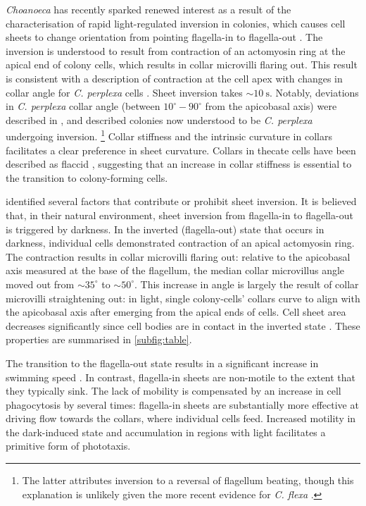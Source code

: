 \textit{Choanoeca} has recently sparked renewed interest as a result of the characterisation of rapid light-regulated inversion in colonies, which causes cell sheets to change orientation from pointing flagella-in to flagella-out \citep{brunet2019}.
The inversion is understood to result from contraction of an actomyosin ring at the apical end of colony cells, which results in collar microvilli flaring out. 
This result is consistent with a description of contraction at the cell apex with changes in collar angle for \textit{C. perplexa} cells \citep{leadbeater1977}.
Sheet inversion takes $\sim\SI{10}{\second}$.
Notably, deviations in \textit{C. perplexa} collar angle (between $10^\circ-90^\circ$ from the apicobasal axis) were described in \citet{ellis1930}, and \citet{leadbeater1983} described colonies now understood to be \textit{C. perplexa} undergoing inversion. 
\footnote{The latter attributes inversion to a reversal of flagellum beating, though this explanation is unlikely given the more recent evidence for \textit{C. flexa} \citep{brunet2019}.}
Collar stiffness and the intrinsic curvature in collars facilitates a clear preference in sheet curvature. 
Collars in thecate cells have been described as flaccid \citep{leadbeater1977}, suggesting that an increase in collar stiffness is essential to the transition to colony-forming cells. 

\citet{brunet2019} identified several factors that contribute or prohibit sheet inversion. 
It is believed that, in their natural environment, sheet inversion from flagella-in to flagella-out is triggered by darkness. 
In the inverted (flagella-out) state that occurs in darkness, individual cells demonstrated contraction of an apical actomyosin ring.
The contraction results in collar microvilli flaring out: relative to the apicobasal axis measured at the base of the flagellum, the median collar microvillus angle moved out from $\sim35^\circ$ to $\sim50^\circ$.
This increase in angle is largely the result of collar microvilli straightening out: in light, single colony-cells' collars curve to align with the apicobasal axis after emerging from the apical ends of cells.
Cell sheet area decreases significantly since cell bodies are in contact in the inverted state \citep{thibaut}.
These properties are summarised in \cref{subfig:table}.

The transition to the flagella-out state results in a significant increase in swimming speed \citep{brunet2019}. 
In contrast, flagella-in sheets are non-motile to the extent that they typically sink. 
The lack of mobility is compensated by an increase in cell phagocytosis by several times: flagella-in sheets are substantially more effective at driving flow towards the collars, where individual cells feed.
Increased motility in the dark-induced state and accumulation in regions with light facilitates a primitive form of phototaxis.

